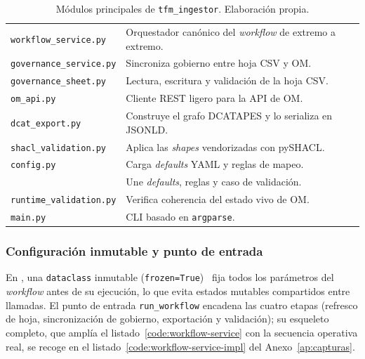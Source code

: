 \begin{table}[ht]
\footnotesize
\centering
\begin{tabular}{|L{4cm}|L{8cm}|}
\hline
{}
 &  \\ \hline
\texttt{workflow\_service.py} & Orquestador canónico del \emph{workflow} de extremo a extremo. \\ \hline
\texttt{governance\_service.py} & Sincroniza gobierno entre hoja \ac{CSV} y \ac{OM}. \\ \hline
\texttt{governance\_sheet.py} & Lectura, escritura y validación de la hoja \ac{CSV}. \\ \hline
\texttt{om\_api.py} & Cliente \ac{REST} ligero para la \ac{API} de \ac{OM}. \\ \hline
\texttt{dcat\_export.py} & Construye el grafo \ac{DCATAPES} y lo serializa en \ac{JSONLD}. \\ \hline
\texttt{shacl\_validation.py} & Aplica las \emph{shapes} vendorizadas con pySHACL. \\ \hline
\texttt{config.py} & Carga \emph{defaults} \ac{YAML} y reglas de mapeo. \\ \hline
{} & Une \emph{defaults}, reglas y caso de validación. \\ \hline
\texttt{runtime\_validation.py} & Verifica coherencia del estado vivo de \ac{OM}. \\ \hline
\texttt{main.py} & \ac{CLI} basado en \texttt{argparse}. \\ \hline
\end{tabular}
\caption{Módulos principales de \texttt{tfm\_ingestor}. Elaboración propia.}
\label{tab:modulos-python}
\end{table}

\subsubsection{Configuración inmutable y punto de entrada}

En , una \texttt{dataclass} inmutable (\texttt{frozen=True})~\cite{pythonDataclasses} fija todos los parámetros del \emph{workflow} antes de su ejecución, lo que evita estados mutables compartidos entre llamadas. El punto de entrada \texttt{run\_workflow} encadena las cuatro etapas (refresco de hoja, sincronización de gobierno, exportación y validación); su esqueleto completo, que amplía el listado~\ref{code:workflow-service} con la secuencia operativa real, se recoge en el listado~\ref{code:workflow-service-impl} del Anexo~\ref{ap:capturas}.

